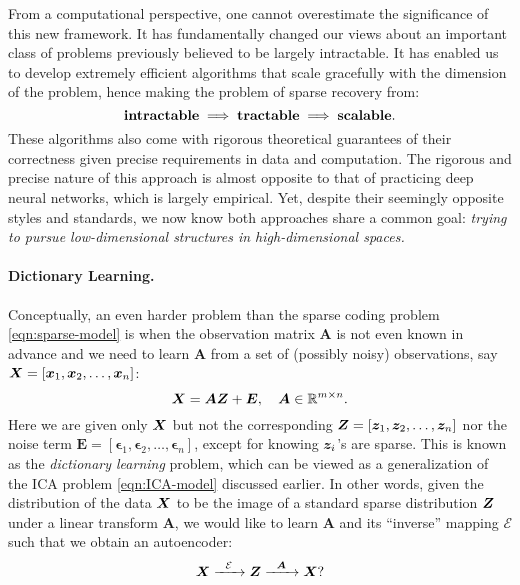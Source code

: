 \documentclass[../../book-main.tex]{subfiles}
\begin{document}
From a computational perspective, one cannot overestimate the significance of this new framework. It has fundamentally changed our views about an important class of problems previously believed to be largely intractable. It has enabled us to develop extremely efficient algorithms that scale gracefully with the dimension of the problem, hence making the problem of sparse recovery from:
\begin{equation}
    \mbox{\textbf{intractable}} \;
   \Longrightarrow \; \mbox{\textbf{tractable}} \; \Longrightarrow \; 
   \mbox{\textbf{scalable}}.
\end{equation}
These algorithms also come with rigorous theoretical guarantees of their correctness given precise requirements in data and computation. The rigorous and precise nature of this approach is almost opposite to that of practicing deep neural networks, which is largely empirical. Yet, despite their seemingly opposite styles and standards, we now know both approaches share a common goal: {\em trying to pursue low-dimensional structures in high-dimensional spaces.}

\paragraph{Dictionary Learning.}
Conceptually, an even harder problem than the sparse coding problem \eqref{eqn:sparse-model} is when the observation matrix $\boldsymbol{A}$ is not even known in advance and we need to learn $\boldsymbol{A}$ from a set of (possibly noisy) observations, say $\bm{X} = [\bm{x}_1, \bm{x}_2, \ldots, \bm{x}_n]$:
\begin{equation}
    \bm{X} = \boldsymbol{A} \bm{Z} + \boldsymbol{E}, \quad \boldsymbol{A} \in \mathbb{R}^{m\times n}.
    \label{eqn:dictionary-learning}
\end{equation}
Here we are given only $\bm{X}$ but not the corresponding $\bm{Z} = [\bm{z}_1, \bm{z}_2, \ldots, \bm{z}_n]$ nor the noise term $\boldsymbol{E}= [\boldsymbol{\epsilon}_1, \boldsymbol{\epsilon}_2, \ldots, \boldsymbol{\epsilon}_n]$, except for knowing $\bm{z}_i$'s are sparse. This is known as the {\em dictionary learning} problem, which can be viewed as a generalization of the ICA problem \eqref{eqn:ICA-model} discussed earlier. In other words, given the distribution of the data $\bm{X}$ to be the image of a standard sparse distribution $\bm{Z}$ under a linear transform $\boldsymbol{A}$, we would like to learn $\boldsymbol{A}$ and its ``inverse'' mapping $\mathcal{E}$ such that we obtain an autoencoder:
\begin{equation}
    \bm{X}   \xrightarrow{\hspace{2mm} \mathcal{E} \hspace{2mm}}  \bm{Z} \xrightarrow{\hspace{2mm} \boldsymbol{A} \hspace{2mm}} \bm{X}?
       \label{eqn:decoding-DL}
\end{equation}
\end{document}
